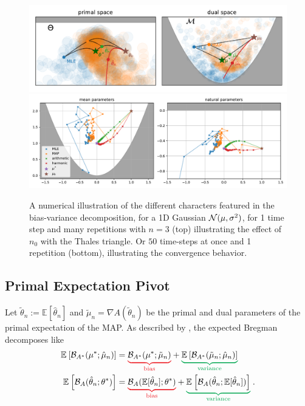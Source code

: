 \documentclass{article}
\newcommand*{\expect}[2][]{\ensuremath{\mathbb{E}_{#1} \left[ #2 \right] }} %
\newcommand{\logpart}{A}
\newcommand{\bregman}{\cB_\logpart}
\newcommand{\bregmanconj}{\cB_{\logpart^*}}
\newcommand{\nat}{\theta}
\newcommand{\MAPm}{\hat \mu_n}
\newcommand{\MAPt}{\hat \nat_n}
\begin{document}
\begin{figure}[ht]
	\centering
	\includegraphics[width=\textwidth]{figs/thales/numerical_schema_n=3.pdf}
	\includegraphics[width=\textwidth]{figs/2d/gaussian_convergence.pdf}
	\caption{A numerical illustration of the different characters featured in the bias-variance decomposition, for a 1D Gaussian ${\mathcal N}(\mu, \sigma^2)$, for 1 time step  and many repetitions with $n=3$ (top) illustrating the effect of $n_0$ with the Thales triangle. Or $50$ time-steps at once and 1 repetition (bottom), illustrating the convergence behavior.}
	\label{fig:bias-variance-numerical}
\end{figure}


\subsection{Primal Expectation Pivot}
Let $\tilde \theta_n := \expect{\hat \theta_n}$ and $\tilde \mu_n = \nabla \logpart(\tilde \theta_n )$ be the primal and dual parameters of the primal expectation of the MAP.
As described by \citet[Theorem 0.1]{pfau2013generalized}, the  expected Bregman decomposes like
\begin{align}
	\expect{\bregmanconj(\mu^* ; \hat \mu_n)} 
	&= \bias{\bregmanconj(\mu^* ; \tilde \mu_n)}
	+ \variance{\expect{\bregmanconj(\tilde \mu_n ; \MAPm)}} \\
	\expect{\bregman(\MAPt; \nat^*)} 
	&= \bias{\bregman(\E[\MAPt]; \nat^*)}
	+ \variance{\expect{\bregman(\MAPt; \E[\MAPt])}}  \; .
	\label{eq:primal_pivot}
\end{align}
\end{document}
